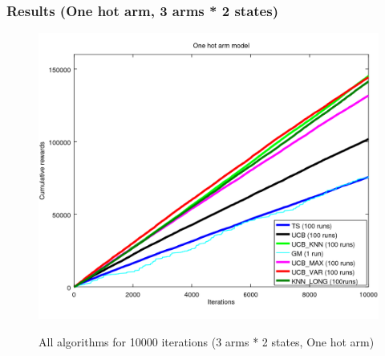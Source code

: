 \documentclass[french]{beamer}
\begin{document}
\begin{frame}
	\frametitle{Results (One hot arm, 3 arms * 2 states)}
	 
	\begin{figure}[h]
		\begin{center}
			\vspace{-10pt}
			\includegraphics[width=1.05\textheight]{all_10000it.png}
			
			\vspace{-7pt}
			\scriptsize{All algorithms for 10000 iterations (3 arms * 2 states, One hot arm)}
		\end{center}
	\end{figure}
\end{frame}
\end{document}
